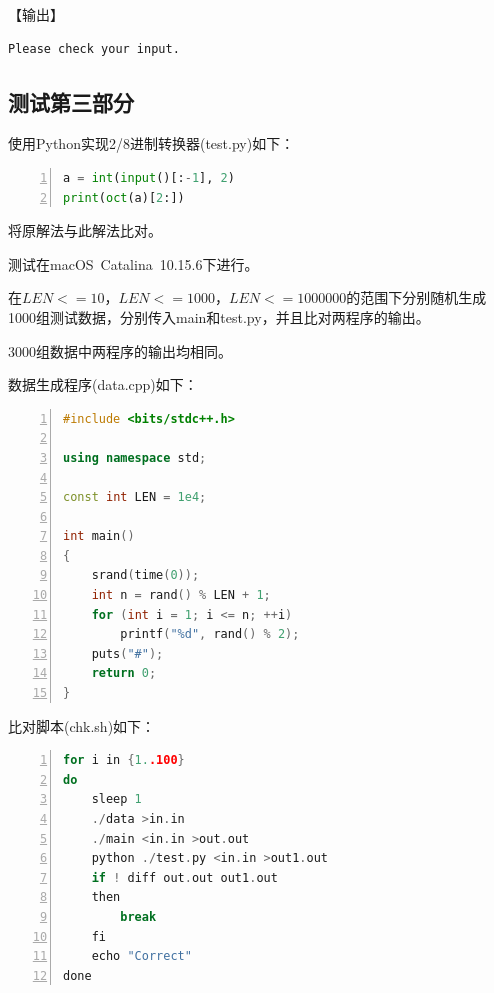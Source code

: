 \documentclass{article}
\begin{document}
【输出】

\begin{lstlisting}[language={bash},
    basicstyle=\small\consolas]
Please check your input.
\end{lstlisting}

\subsection{测试第三部分}

使用Python实现2/8进制转换器(test.py)如下：

\begin{lstlisting}[language={Python},
    numbers=left,
    numberstyle=\tiny\consolas,
    basicstyle=\small\consolas]
a = int(input()[:-1], 2)
print(oct(a)[2:])
\end{lstlisting}

将原解法与此解法比对。

测试在macOS\ Catalina\ 10.15.6下进行。

在$LEN<=10$，$LEN<=1000$，$LEN<=1000000$的范围下分别随机生成1000组测试数据，分别传入main和test.py，并且比对两程序的输出。

3000组数据中两程序的输出均相同。

数据生成程序(data.cpp)如下：

\begin{lstlisting}[language={C++},
    numbers=left,
    numberstyle=\tiny\consolas,
    basicstyle=\small\consolas]
#include <bits/stdc++.h>

using namespace std;

const int LEN = 1e4;

int main()
{
    srand(time(0));
    int n = rand() % LEN + 1;
    for (int i = 1; i <= n; ++i)
        printf("%d", rand() % 2);
    puts("#");
    return 0;
}
\end{lstlisting}

比对脚本(chk.sh)如下：

\begin{lstlisting}[language={C++},
    numbers=left,
    numberstyle=\tiny\consolas,
    basicstyle=\small\consolas]
for i in {1..100}
do
    sleep 1
    ./data >in.in
    ./main <in.in >out.out
    python ./test.py <in.in >out1.out
    if ! diff out.out out1.out
    then
        break
    fi
    echo "Correct"
done
\end{lstlisting}
\end{document}
